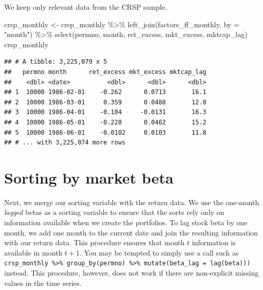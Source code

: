 \documentclass[
]{krantz}
\newenvironment{Shaded}{\begin{snugshade}}{\end{snugshade}}
\newcommand{\AttributeTok}[1]{\textcolor[rgb]{0.61,0.61,0.61}{#1}}
\newcommand{\FunctionTok}[1]{\textcolor[rgb]{0,0,0}{#1}}
\newcommand{\NormalTok}[1]{#1}
\newcommand{\OtherTok}[1]{\textcolor[rgb]{0.37,0.37,0.37}{#1}}
\newcommand{\SpecialCharTok}[1]{\textcolor[rgb]{0,0,0}{#1}}
\newcommand{\StringTok}[1]{\textcolor[rgb]{0.5,0.5,0.5}{#1}}
\begin{document}
We keep only relevant data from the CRSP sample.

\begin{Shaded}
\begin{Highlighting}[]
\NormalTok{crsp\_monthly }\OtherTok{\textless{}{-}}\NormalTok{ crsp\_monthly }\SpecialCharTok{\%\textgreater{}\%}
  \FunctionTok{left\_join}\NormalTok{(factors\_ff\_monthly, }\AttributeTok{by =} \StringTok{"month"}\NormalTok{) }\SpecialCharTok{\%\textgreater{}\%}
  \FunctionTok{select}\NormalTok{(permno, month, ret\_excess, mkt\_excess, mktcap\_lag)}
\NormalTok{crsp\_monthly}
\end{Highlighting}
\end{Shaded}

\begin{verbatim}
## # A tibble: 3,225,079 x 5
##   permno month      ret_excess mkt_excess mktcap_lag
##    <dbl> <date>          <dbl>      <dbl>      <dbl>
## 1  10000 1986-02-01    -0.262      0.0713       16.1
## 2  10000 1986-03-01     0.359      0.0488       12.0
## 3  10000 1986-04-01    -0.104     -0.0131       16.3
## 4  10000 1986-05-01    -0.228      0.0462       15.2
## 5  10000 1986-06-01    -0.0102     0.0103       11.8
## # ... with 3,225,074 more rows
\end{verbatim}

\hypertarget{sorting-by-market-beta}{%
\section{Sorting by market beta}\label{sorting-by-market-beta}}

Next, we merge our sorting variable with the return data. We use the one-month \emph{lagged} betas as a sorting variable to ensure that the sorts rely only on information available when we create the portfolios.
To lag stock beta by one month, we add one month to the current date and join the resulting information with our return data.
This procedure ensures that month \(t\) information is available in month \(t+1\).
You may be tempted to simply use a call such as \texttt{crsp\_monthly\ \%\textgreater{}\%\ group\_by(permno)\ \%\textgreater{}\%\ mutate(beta\_lag\ =\ lag(beta)))} instead.
This procedure, however, does not work if there are non-explicit missing values in the time series.
\end{document}

